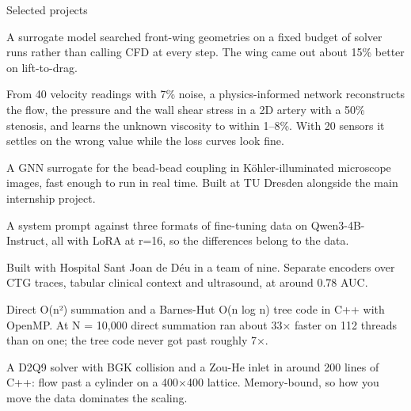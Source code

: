 \documentclass[10pt,a4paper]{article}
\begin{document}
\begin{cvsection}{Selected projects}

  {A surrogate model searched front-wing geometries on a fixed budget of
   solver runs rather than calling CFD at every step. The wing came out about
   15\% better on lift-to-drag.%
   }

  {From 40 velocity readings with 7\% noise, a physics-informed network
   reconstructs the flow, the pressure and the wall shear stress in a 2D
   artery with a 50\% stenosis, and learns the unknown viscosity to within
   1--8\%. With 20 sensors it settles on the wrong value while the loss
   curves look fine.%
   }

  {A GNN surrogate for the bead-bead coupling in Köhler-illuminated
   microscope images, fast enough to run in real time. Built at TU Dresden
   alongside the main internship project.}

  {A system prompt against three formats of fine-tuning data on
   Qwen3-4B-Instruct, all with LoRA at r=16, so the differences belong to the
   data.%
   }

  {Built with Hospital Sant Joan de Déu in a team of nine. Separate encoders
   over CTG traces, tabular clinical context and ultrasound, at around 0.78
   AUC.%
   }

  {Direct O(n²) summation and a Barnes-Hut O(n log n) tree code in C++
   with OpenMP. At N = 10,000 direct summation ran about 33× faster on
   112 threads than on one; the tree code never got past roughly 7×.%
   }

  {A D2Q9 solver with BGK collision and a Zou-He inlet in around 200 lines of
   C++: flow past a cylinder on a 400×400 lattice. Memory-bound, so
   how you move the data dominates the scaling.%
   }


\end{cvsection}
\end{document}
